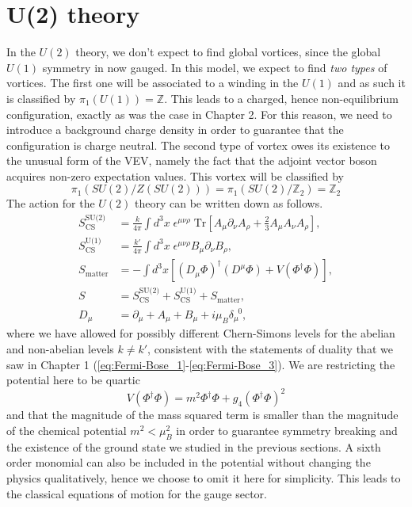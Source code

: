

\section{U(2) theory}
In the $U(2)$ theory, we don't expect to find global vortices, since the global $U(1)$ symmetry in now gauged. In this model, we expect to find \textit{two types} of vortices. The first one will be associated to a winding in the $U(1)$ and as such it is classified by $\pi_1(U(1))= \mathbb{Z}$. This leads to a charged, hence non-equilibrium configuration, exactly as was the case in Chapter 2. For this reason, we need to introduce a background charge density in order to guarantee that the configuration is charge neutral. The second type of vortex owes its existence to the unusual form of the VEV, namely the fact that the adjoint vector boson acquires non-zero expectation values. This vortex will be classified by $$\pi_1(SU(2)/Z(SU(2)))= \pi_1(SU(2)/\mathbb{Z}_2) = \mathbb{Z}_2$$ The action for the $U(2)$ theory can be written down as follows.    
\begin{align}
    S^{\text{SU(2)}}_{\text{CS}} &= \frac{k}{4 \pi} \int d^3x \; \epsilon^{\mu \nu \rho} \; \mathrm{Tr} \left[A_{\mu} \partial_{\nu}A_{\rho}+ \frac{2}{3} A_{\mu} A_{\nu}A_{\rho} \right], \\
    S^{\text{U(1)}}_{\text{CS}} &= \frac{k'}{4 \pi} \int d^3x \; \epsilon^{\mu \nu \rho} B_{\mu} \partial_{\nu} B_{\rho},\\
    S_{\text{matter}}&= - \int d^3x \left[ \left(D_{\mu} \Phi \right)^{\dag} \left(D^{\mu} \Phi \right) + V\left(\Phi^{\dag}\Phi \right)\right], \\
    S &= S^{\text{SU(2)}}_{\text{CS}} + S^{\text{U(1)}}_{\text{CS}} + S_{\text{matter}}, \\
    D_{\mu} &= \partial_{\mu} + A_{\mu}+B_{\mu} +i \mu_B \delta_{\mu}^{\;\; 0},
\end{align}
where we have allowed for possibly different Chern-Simons levels for the abelian and non-abelian levels $k\neq k'$, consistent with the statements of duality that we saw in Chapter 1 (\ref{eq:Fermi-Bose_1}-\ref{eq:Fermi-Bose_3}). We are restricting the potential  here to be quartic $$V\left(\Phi^{\dag} \Phi \right)= m^2 \Phi^{\dag} \Phi + g_4\left( \Phi^{\dag} \Phi\right)^2$$and that the magnitude of the mass squared term is smaller than the magnitude of the chemical potential $m^2<\mu_B^2$ in order to guarantee symmetry breaking and the existence of the ground state we studied in the previous sections. A sixth order monomial can also be included in the potential without changing the physics qualitatively, hence we choose to omit it here for simplicity. This leads to the classical equations of motion for the gauge sector.
